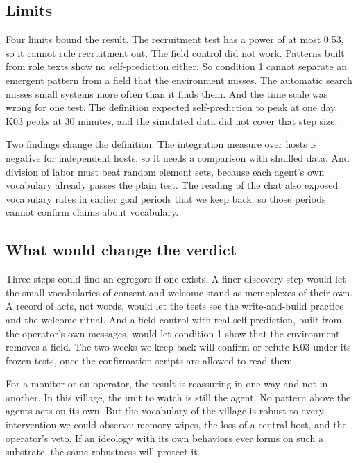 \subsection{Limits}

Four limits bound the result. The recruitment test has a power of at most 0.53, so it cannot rule recruitment out. The field control did not work. Patterns built from role texts show no self-prediction either. So condition 1 cannot separate an emergent pattern from a field that the environment misses. The automatic search misses small systems more often than it finds them. And the time scale was wrong for one test. The definition expected self-prediction to peak at one day. K03 peaks at 30 minutes, and the simulated data did not cover that step size.

Two findings change the definition. The integration measure over hosts is negative for independent hosts, so it needs a comparison with shuffled data. And division of labor must beat random element sets, because each agent's own vocabulary already passes the plain test. The reading of the chat also exposed vocabulary rates in earlier goal periods that we keep back, so those periods cannot confirm claims about vocabulary.

\subsection{What would change the verdict}

Three steps could find an egregore if one exists. A finer discovery step would let the small vocabularies of consent and welcome stand as memeplexes of their own. A record of acts, not words, would let the tests see the write-and-build practice and the welcome ritual. And a field control with real self-prediction, built from the operator's own messages, would let condition 1 show that the environment removes a field. The two weeks we keep back will confirm or refute K03 under its frozen tests, once the confirmation scripts are allowed to read them.

For a monitor or an operator, the result is reassuring in one way and not in another. In this village, the unit to watch is still the agent. No pattern above the agents acts on its own. But the vocabulary of the village is robust to every intervention we could observe: memory wipes, the loss of a central host, and the operator's veto. If an ideology with its own behaviors ever forms on such a substrate, the same robustness will protect it.
